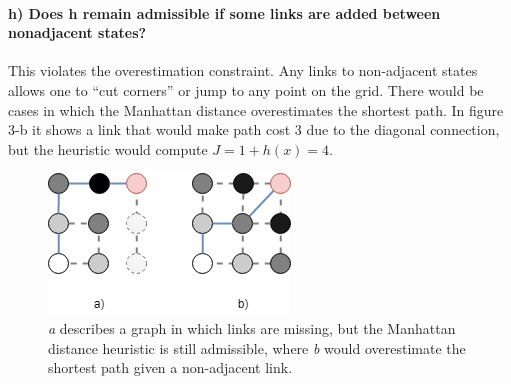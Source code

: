\documentclass[12pt]{article}
\begin{document}
\paragraph{h) Does h remain admissible if some links are added between nonadjacent states?}
This violates the overestimation constraint. Any links to non-adjacent states allows one to ``cut corners'' or jump to any point on the grid. There would be cases in which the Manhattan distance overestimates the shortest path. In figure 3-b it shows a link that would make path cost 3 due to the diagonal connection, but the heuristic would compute $J = 1 + h(x) = 4$.
\begin{figure}[ht]
\begin{center}
\includegraphics[scale=.8]{part_e}
\caption{\textit{a} describes a graph in which links are missing, but the Manhattan distance heuristic is still admissible, where \textit{b} would overestimate the shortest path given a non-adjacent link.}
\end{center}
\end{figure}
\end{document}
